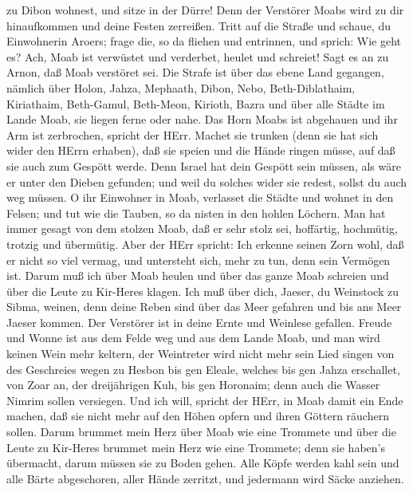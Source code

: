 zu Dibon wohnest, und sitze in der Dürre! Denn der Verstörer Moabs wird
zu dir hinaufkommen und deine Festen zerreißen.  Tritt auf
die Straße und schaue, du Einwohnerin Aroers; frage die, so da fliehen
und entrinnen, und sprich: Wie geht es?  Ach, Moab ist
verwüstet und verderbet, heulet und schreiet! Sagt es an zu Arnon, daß
Moab verstöret sei.  Die Strafe ist über das ebene Land
gegangen, nämlich über Holon, Jahza, Mephaath,  Dibon,
Nebo, Beth-Diblathaim,  Kiriathaim, Beth-Gamul, Beth-Meon,
 Kirioth, Bazra und über alle Städte im Lande Moab, sie
liegen ferne oder nahe.  Das Horn Moabs ist abgehauen und
ihr Arm ist zerbrochen, spricht der HErr.  Machet sie
trunken (denn sie hat sich wider den HErrn erhaben), daß sie speien und
die Hände ringen müsse, auf daß sie auch zum Gespött werde.
 Denn Israel hat dein Gespött sein müssen, als wäre er
unter den Dieben gefunden; und weil du solches wider sie redest, sollst
du auch weg müssen.  O ihr Einwohner in Moab, verlasset die
Städte und wohnet in den Felsen; und tut wie die Tauben, so da nisten in
den hohlen Löchern.  Man hat immer gesagt von dem stolzen
Moab, daß er sehr stolz sei, hoffärtig, hochmütig, trotzig und
übermütig.  Aber der HErr spricht: Ich erkenne seinen Zorn
wohl, daß er nicht so viel vermag, und untersteht sich, mehr zu tun,
denn sein Vermögen ist.  Darum muß ich über Moab heulen und
über das ganze Moab schreien und über die Leute zu Kir-Heres klagen.
 Ich muß über dich, Jaeser, du Weinstock zu Sibma, weinen,
denn deine Reben sind über das Meer gefahren und bis ans Meer Jaeser
kommen. Der Verstörer ist in deine Ernte und Weinlese gefallen.
 Freude und Wonne ist aus dem Felde weg und aus dem Lande
Moab, und man wird keinen Wein mehr keltern, der Weintreter wird nicht
mehr sein Lied singen  von des Geschreies wegen zu Hesbon
bis gen Eleale, welches bis gen Jahza erschallet, von Zoar an, der
dreijährigen Kuh, bis gen Horonaim; denn auch die Wasser Nimrim sollen
versiegen.  Und ich will, spricht der HErr, in Moab damit
ein Ende machen, daß sie nicht mehr auf den Höhen opfern und ihren
Göttern räuchern sollen.  Darum brummet mein Herz über Moab
wie eine Trommete und über die Leute zu Kir-Heres brummet mein Herz wie
eine Trommete; denn sie haben's übermacht, darum müssen sie zu Boden
gehen.  Alle Köpfe werden kahl sein und alle Bärte
abgeschoren, aller Hände zerritzt, und jedermann wird Säcke anziehen.
